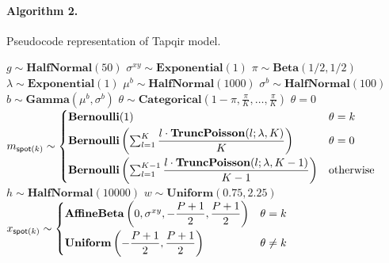 \paragraph{Algorithm 2.} Pseudocode representation of Tapqir model. \\

\begin{algorithmic}[1]
\State $g \sim \mathbf{HalfNormal}(50)$
\State $\sigma^{xy} \sim \mathbf{Exponential}(1)$
\State $\pi \sim \mathbf{Beta}(1/2, 1/2)$
\State $\lambda \sim \mathbf{Exponential}(1)$
    \State $\mu^b \sim \mathbf{HalfNormal}(1000)$
    \State $\sigma^b \sim \mathbf{HalfNormal}(100)$
        \State $b \sim \mathbf{Gamma}(\mu^b, \sigma^b)$
            \State $\theta \sim \mathbf{Categorical}\left(1 - \pi, \frac{\pi}{K}, \dots, \frac{\pi}{K}\right)$
            \State $\theta = 0$
        \EndIf
            \State $ m_{\mathsf{spot}(k)} \sim
                \begin{cases}
                    \mathbf{Bernoulli}(1) & \text{$\theta = k$} \\
                    \mathbf{Bernoulli} \left( \sum_{l=1}^K \dfrac{l \cdot \mathbf{TruncPoisson}(l; \lambda, K)}{K} \right) & \text{$\theta = 0$} \rule{0pt}{4ex} \\
                    \mathbf{Bernoulli} \left( \sum_{l=1}^{K-1} \dfrac{l \cdot \mathbf{TruncPoisson}(l; \lambda, K-1)}{K-1} \right) & \text{otherwise} \rule{0pt}{4ex}
                \end{cases} $
            \State $h \sim \mathbf{HalfNormal}(10000)$
            \State $w \sim \mathbf{Uniform}(0.75, 2.25)$
            \State $ x_{\mathsf{spot}(k)} \sim
                \begin{cases}
                \mathbf{AffineBeta}\left( 0, \sigma^{xy}, -\dfrac{P+1}{2}, \dfrac{P+1}{2} \right) & \theta = k \\
                \mathbf{Uniform}\left(-\dfrac{P+1}{2}, \dfrac{P+1}{2} \right) & \theta \neq k \rule{0pt}{4ex} \end{cases} $

\end{algorithmic}

